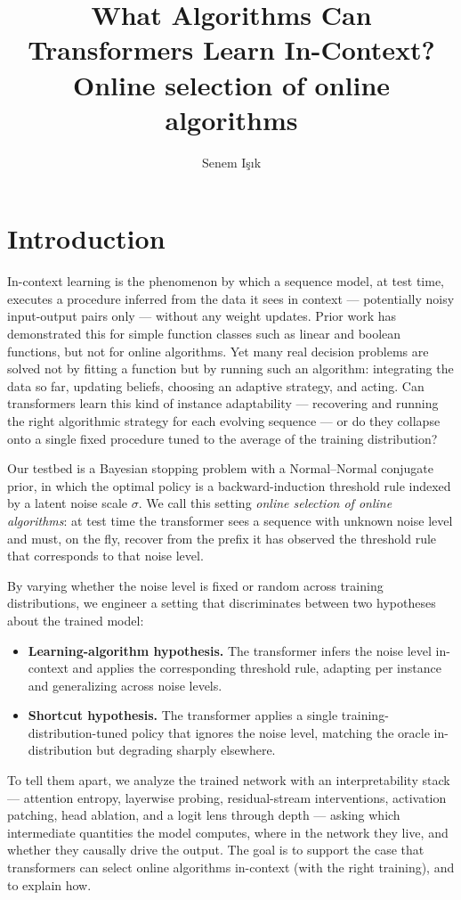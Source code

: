 \documentclass[11pt]{article}
\title{What Algorithms Can Transformers Learn In-Context?\\ Online selection of online algorithms}
\author{Senem I\c{s}\i{}k}
\begin{document}
\maketitle

\tableofcontents
\bigskip

\section{Introduction}
\label{sec:intro}

In-context learning is the phenomenon by which a sequence model, at test time, executes a procedure inferred from the data it sees in context --- potentially noisy input-output pairs only --- without any weight updates. Prior work has demonstrated this for simple function classes such as linear and boolean functions, but not for online algorithms. Yet many real decision problems are solved not by fitting a function but by running such an algorithm: integrating the data so far, updating beliefs, choosing an adaptive strategy, and acting. Can transformers learn this kind of instance adaptability --- recovering and running the right algorithmic strategy for each evolving sequence --- or do they collapse onto a single fixed procedure tuned to the average of the training distribution?

Our testbed is a Bayesian stopping problem with a Normal--Normal conjugate prior, in which the optimal policy is a backward-induction threshold rule indexed by a latent noise scale $\sigma$. We call this setting \emph{online selection of online algorithms}: at test time the transformer sees a sequence with unknown noise level and must, on the fly, recover from the prefix it has observed the threshold rule that corresponds to that noise level.

By varying whether the noise level is fixed or random across training distributions, we engineer a setting that discriminates between two hypotheses about the trained model:
\begin{itemize}
\item \textbf{Learning-algorithm hypothesis.} The transformer infers the noise level in-context and applies the corresponding threshold rule, adapting per instance and generalizing across noise levels.
\item \textbf{Shortcut hypothesis.} The transformer applies a single training-distribution-tuned policy that ignores the noise level, matching the oracle in-distribution but degrading sharply elsewhere.
\end{itemize}
To tell them apart, we analyze the trained network with an interpretability stack --- attention entropy, layerwise probing, residual-stream interventions, activation patching, head ablation, and a logit lens through depth --- asking which intermediate quantities the model computes, where in the network they live, and whether they causally drive the output. The goal is to support the case that transformers can select online algorithms in-context (with the right training), and to explain how.
\end{document}

